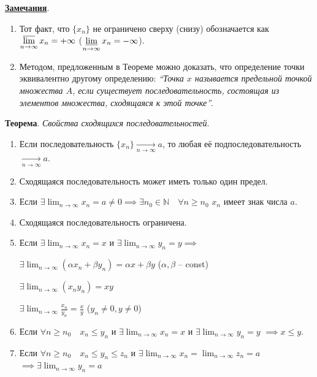 \documentclass[a4paper,oneside]{article}
\newcommand{\parspace}{\vspace{10pt}}
\newcommand{\dslim}{\displaystyle\lim}
\newcommand{\dslimn}{\dslim_{n \to \infty}}
\begin{document}
\parspace

\underline{\textbf{Замечания}}.
\begin{enumerate}
    \item Тот факт, что $\{x_n\}$ не ограничено сверху (снизу) обозначается как 
    $\displaystyle\varlimsup_{n \to \infty} x_n = +\infty$ 
    ($\displaystyle\varliminf_{n \to \infty} x_n = -\infty$).

    \item Методом, предложенным в Теореме можно доказать, что определение точки
    эквивалентно другому определению: \textit{``Точка $x$ называется предельной точкой
    множества $A$, если существует последовательность, состоящая из элементов
    множества, сходящаяся к этой точке''}.
\end{enumerate}

\parspace

\textbf{Теорема}. \textit{Свойства сходящихся последовательностей}.

\begin{enumerate}
    \item Если последовательность $\{x_n\} \underset{n \to \infty}{\to} a$,
    то любая её подпоследовательность $\underset{n \to \infty}{\to} a$.

    \item Сходящаяся последовательность может иметь только один предел.
    \item Если $\exists \dslimn x_n = a \ne 0 \implies
    \exists n_0 \in \mathbb{N} \quad \forall n \ge n_0$ $x_n$ имеет знак числа $a$.

    \item Сходящаяся последовательность ограничена.
    \item Если $\exists \dslimn x_n = x$ и
    $\exists \dslimn y_n = y \implies$

    $\exists \dslimn (\alpha x_n + \beta y_n) = \alpha x + \beta y$
    ($\alpha, \beta$ -- const)

    $\exists \dslimn (x_n y_n) = x y$

    $\exists \dslimn \frac{x_n}{y_n} = \frac{x}{y}$
    ($y_n \ne 0, y \ne 0$)

    \item Если $\forall n \ge n_0 \quad x_n \le y_n$ и 
    $\exists \dslimn x_n = x$ и
    $\exists \dslimn y_n = y$ $\implies x \le y$.

    \item Если $\forall n \ge n_0 \quad x_n \le y_n \le z_n$ и
    $\exists \dslimn x_n = 
    \dslimn z_n = a$
    $\implies \exists \dslimn y_n = a$
\end{enumerate}
\end{document}
